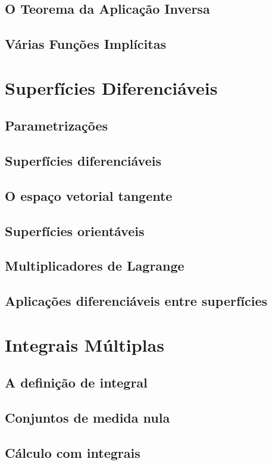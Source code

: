 \documentclass{article}
\begin{document}
\subsection{O Teorema da Aplicação Inversa}
\subsection{Várias Funções Implícitas}

\section{Superfícies Diferenciáveis}
\subsection{Parametrizações}
\subsection{Superfícies diferenciáveis}
\subsection{O espaço vetorial tangente}
\subsection{Superfícies orientáveis}
\subsection{Multiplicadores de Lagrange}
\subsection{Aplicações diferenciáveis entre superfícies}

\section{Integrais Múltiplas}
\subsection{A definição de integral}
\subsection{Conjuntos de medida nula}
\subsection{Cálculo com integrais}
\end{document}
